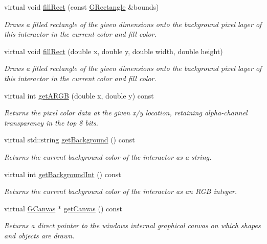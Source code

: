\begin{DoxyCompactItemize}
virtual void \mbox{\hyperlink{classGDrawingSurface_ae6582295003bf2488836b1993dadbad7}{fill\+Rect}} (const \mbox{\hyperlink{classGRectangle}{G\+Rectangle}} \&bounds)
\begin{DoxyCompactList}\small\item\em Draws a filled rectangle of the given dimensions onto the background pixel layer of this interactor in the current color and fill color. \end{DoxyCompactList}\item 
virtual void \mbox{\hyperlink{classGDrawingSurface_aac3ae7d3aee950de78eca0e108352254}{fill\+Rect}} (double x, double y, double width, double height)
\begin{DoxyCompactList}\small\item\em Draws a filled rectangle of the given dimensions onto the background pixel layer of this interactor in the current color and fill color. \end{DoxyCompactList}\item 
virtual int \mbox{\hyperlink{classGDrawingSurface_ae394d39f20476570e083918d991c25bd}{get\+A\+R\+GB}} (double x, double y) const
\begin{DoxyCompactList}\small\item\em Returns the pixel color data at the given x/y location, retaining alpha-\/channel transparency in the top 8 bits. \end{DoxyCompactList}\item 
virtual std\+::string \mbox{\hyperlink{classGDrawingSurface_a808e22cc1fdfbecf71ed8c64ef4600e0}{get\+Background}} () const
\begin{DoxyCompactList}\small\item\em Returns the current background color of the interactor as a string. \end{DoxyCompactList}\item 
virtual int \mbox{\hyperlink{classGDrawingSurface_a9e827257a55cb8cf4d9de2ec6bcfd7a0}{get\+Background\+Int}} () const
\begin{DoxyCompactList}\small\item\em Returns the current background color of the interactor as an R\+GB integer. \end{DoxyCompactList}\item 
virtual \mbox{\hyperlink{classGCanvas}{G\+Canvas}} $\ast$ \mbox{\hyperlink{classGWindow_a7aed3237105aa56033642252b3b1445e}{get\+Canvas}} () const
\begin{DoxyCompactList}\small\item\em Returns a direct pointer to the window\textquotesingle{}s internal graphical canvas on which shapes and objects are drawn. \end{DoxyCompactList}\item 

\end{DoxyCompactItemize}
